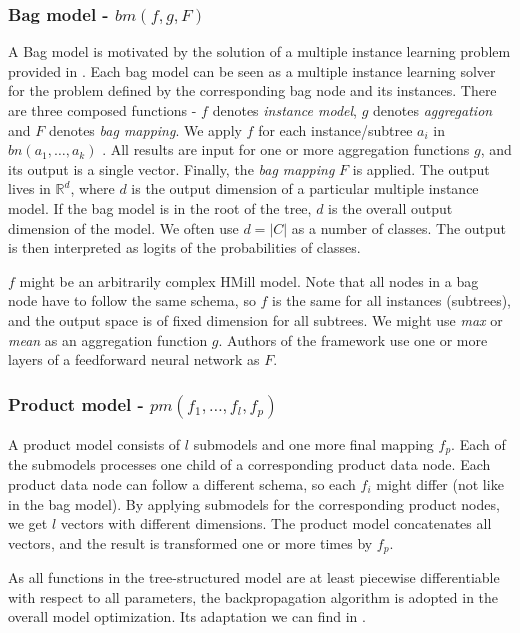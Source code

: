 \subsubsection{Bag model - $bm(f,g,F)$}
A Bag model is motivated by the solution of a multiple instance learning problem provided in \cite{Pevny2016a}. Each bag model can be seen as a multiple instance learning solver for the problem defined by the corresponding bag node and its instances. There are three composed functions - $f$ denotes \emph{instance model}, $g$ denotes \emph{aggregation} and $F$ denotes \emph{bag mapping}. We apply $f$ for each instance/subtree $a_i$ in $bn(a_1,\dots,a_k)$ . All results are input for one or more aggregation functions $g$, and its output is a single vector. Finally, the \emph{bag mapping} $F$ is applied. The output lives in  $\mathbb{R}^d$, where $d$ is the output dimension of a particular multiple instance model. If the bag model is in the root of the tree, $d$ is the overall output dimension of the model. We often use $d=|C|$ as a number of classes. The output is then interpreted as logits of the probabilities of classes.

$f$ might be an arbitrarily complex HMill model. Note that all nodes in a bag node have to follow the same schema, so $f$ is the same for all instances (subtrees), and the output space is of fixed dimension for all subtrees. We might use \emph{max} or \emph{mean} as an aggregation function $g$. Authors of the framework use one or more layers of a feedforward neural network as $F$.

\subsubsection{Product model - $pm(f_1,\dots,f_l,f_p)$}
A product model consists of $l$ submodels and one more final mapping $f_p$. Each of the submodels processes one child of a corresponding product data node. Each product data node can follow a different schema, so each $f_i$ might differ (not like in the bag model). By applying submodels for the corresponding product nodes, we get $l$ vectors with different dimensions. The product model concatenates all vectors, and the result is transformed one or more times by $f_p$.

As all functions in the tree-structured model are at least piecewise differentiable with respect to all parameters, the backpropagation algorithm is adopted in the overall model optimization. Its adaptation we can find in \cite{Mandlik2020}.

